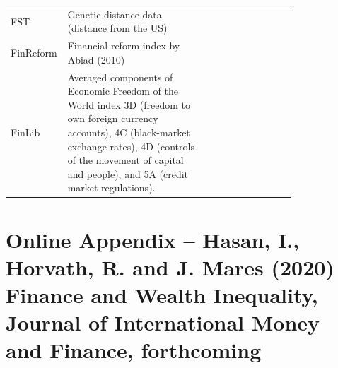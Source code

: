 \documentclass[a4paper,11pt]{article}
\begin{document}
\begin{center}
\begin{longtable}{l p{0.50\linewidth} p{0.3\linewidth}}
			FST & Genetic distance data (distance from the US) & \href{https://sites.tufts.edu/enricospolaore/research/}{\citet{spolaore2009diffusion}} \\
			
			FinReform & Financial reform index by Abiad (2010) & \href{https://www.imf.org/en/Publications/WP/Issues/2016/12/31/A-New-Database-of-Financial-Reforms-22485}{\citet{Abiadetal2008}} \\
			
			FinLib & Averaged components of Economic Freedom of the World index 3D (freedom to own foreign currency accounts), 4C (black-market exchange rates), 4D (controls of the movement of capital and people), and 5A (credit market regulations). & \href{https://www.fraserinstitute.org/economic-freedom/dataset}{\citet{gwartney2017}} \\
			
		\end{longtable}
	\end{center}




\newpage
\section*{Online Appendix -- Hasan, I., Horvath, R. and J. Mares (2020) Finance and Wealth Inequality, Journal of International Money and Finance, forthcoming}
\label{sec:onlineapp}
\renewcommand{\thesection}{B\arabic{section}}%
\renewcommand{\thetable}{B\arabic{table}}%
\renewcommand{\thefigure}{B\arabic{figure}}%
\renewcommand{\theequation}{B\arabic{equation}}%
\setcounter{equation}{0}%
\setcounter{table}{0}%
\setcounter{figure}{0}%
\end{document}
